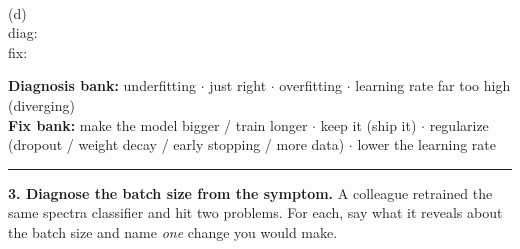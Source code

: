 \documentclass[11pt]{article}
\newif\ifsolution
\newcommand{\blk}[1]{\underline{\hspace{#1}}}
\newcommand{\rb}[2]{\ifsolution\textbf{#1}\else\blk{#2}\fi}
\newcommand{\keybox}[1]{\ifsolution\par\vspace{2pt}%
  \fbox{\parbox{0.965\textwidth}{\small\textbf{Answer.}\; #1}}\par\fi}
\begin{document}
\begin{center}
%
\begin{minipage}[t]{0.235\linewidth}\centering
{}\\[2pt]
{\footnotesize (d)}\\[3pt]
{\scriptsize diag:}\;\rb{LR too high}{1.5cm}\\[4pt]
{\scriptsize fix:}\;\rb{lower the LR}{1.5cm}
\end{minipage}
\end{center}

\vspace{2pt}
\begin{center}
{\small \textbf{Diagnosis bank:}\;\; underfitting \;$\cdot$\; just right \;$\cdot$\; overfitting
\;$\cdot$\; learning rate far too high (diverging) \\[2pt]
\textbf{Fix bank:}\;\; make the model bigger / train longer \;$\cdot$\; keep it (ship it)
\;$\cdot$\; regularize (dropout / weight decay / early stopping / more data) \;$\cdot$\;
lower the learning rate}
\end{center}

\keybox{(a) \textbf{underfitting $\rightarrow$ bigger model / train longer}: both curves sit high and
close and barely move --- the model is too weak or hasn't trained enough, so it hasn't even fit the
training data yet. (b) \textbf{just right $\rightarrow$ keep it}: both drop low and stay close, with
only a small gap --- validation tracks training down. (c) \textbf{overfitting $\rightarrow$
regularize}: training loss keeps falling toward zero while validation \emph{turns back up} (dot marks
the best epoch) --- the model is memorizing training quirks; add dropout / weight decay, stop early,
or get more/more-varied data. (d) \textbf{learning rate far too high $\rightarrow$ lower it}: the
(training) loss swings wildly and \emph{climbs} --- the steps are overshooting; this is a bad-LR
problem, not a capacity or memorizing problem. \emph{The tell for (c) vs.\ the rest: only in (c) do
the two curves \emph{split apart} --- training good, validation bad.}}

\vspace{2pt}\hrule\vspace{5pt}

\textbf{3. Diagnose the batch size from the symptom.}\; {\small A colleague retrained the same
spectra classifier and hit two problems. For each, say what it reveals about the batch size and name
\emph{one} change you would make.}
\end{document}
